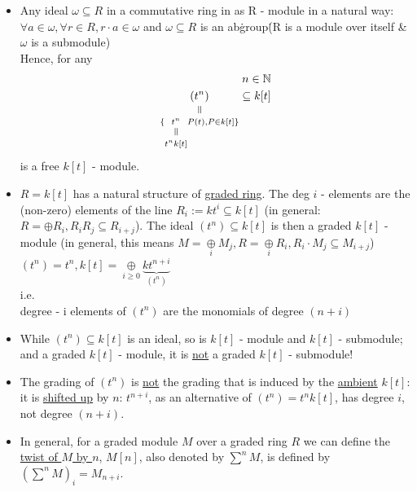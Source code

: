 \documentclass[11pt,a4paper]{report}
\newcommand{\verteq}{\rotatebox{90}{$\,=$}}
\newcommand{\equalto}[2]{\underset{\scriptstyle\overset{\mkern4mu\verteq}{#2}}{#1}}
\begin{document}
              \begin{itemize}
               \item 

              
              Any ideal $\omega \subseteq R$ in a commutative ring in as R - module in a natural way: $\forall a \in \omega, \forall r \in R, r\cdot a \in \omega$ and $\omega \subseteq R$ is an ab\. group\. (R is a module over itself \& $\omega$ is a submodule)\\
              Hence, for any
              \begin{align*}
                n \in \mathbb{N}\\
                \equalto{(t^n)}{\{\equalto{t^n}{t^nk[t]} P(t), P \in k[t]\}} \subseteq k[t]
              \end{align*}
              is a free $k[t]$ - module.\\
              \item 
              $R = k[t]$ has a natural structure of \underline{graded ring}. The deg $i$ - elements are the (non-zero) elements of the line $R_i := kt^i \subseteq k[t]$ (in general: $R = \oplus R_i, R_iR_j \subseteq R_{i+j}$).
              The ideal $(t^n) \subseteq k[t]$ is then a graded $k[t]$ - module (in general, this means $M = \underset{i}{\oplus} M_j, R = \underset{i}{\oplus} R_i, R_i \cdot M_j \subseteq M_{i+j}$) $(t^n) = t^n, k[t] = \underset{i \ge 0}{\oplus} \underbrace{kt^{n+i}}_{(t^{n})}$\\
              i.e.\\
              degree - i elements of $(t^n)$ are the monomials of degree $(n+i)$\\
              \item 
              While $(t^n) \subseteq k[t]$ is an ideal, so is $k[t]$ - module and $k[t]$ - submodule; and a graded $k[t]$ - module, it is \underline{not} a graded $k[t]$ - submodule!\\
              \item
              The grading of $(t^n)$ is \underline{not} the grading that is induced by the \underline{ambient} $k[t]$: it is \underline{shifted up} by $n$: $t^{n+i}$, as an alternative of $(t^n) = t^nk[t]$, has degree $i$, not degree $(n+i)$.\\
              \item 
              In general, for a graded module $M$ over a graded ring $R$ we can define the \underline{twist of $M$ by $n$}, $M[n]$, also denoted by $\sum^nM$, is defined by $(\sum^nM)_i = M_{n+i}$.\\

\end{itemize}
\end{document}
